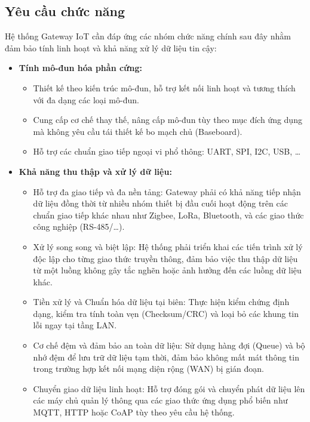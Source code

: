 \subsection{Yêu cầu chức năng}
    Hệ thống Gateway IoT cần đáp ứng các nhóm chức năng chính sau đây nhằm đảm bảo tính linh hoạt và khả năng xử lý dữ liệu tin cậy:

    \begin{itemize}
        \item \textbf{Tính mô-đun hóa phần cứng:}
        \begin{itemize}
            \item Thiết kế theo kiến trúc mô-đun, hỗ trợ kết nối linh hoạt và tương thích với đa dạng các loại mô-đun.
            \item Cung cấp cơ chế thay thế, nâng cấp mô-đun tùy theo mục đích ứng dụng mà không yêu cầu tái thiết kế bo mạch chủ (Baseboard).
            \item Hỗ trợ các chuẩn giao tiếp ngoại vi phổ thông: UART, SPI, I2C, USB, \dots
        \end{itemize}
        
        \item \textbf{Khả năng thu thập và xử lý dữ liệu:}
        \begin{itemize}
            \item Hỗ trợ đa giao tiếp và đa nền tảng: Gateway phải có khả năng tiếp nhận dữ liệu đồng thời từ nhiều nhóm thiết bị đầu cuối hoạt động trên các chuẩn giao tiếp khác nhau như Zigbee, LoRa, Bluetooth, và các giao thức công nghiệp (RS-485/\ldots).
            \item Xử lý song song và biệt lập: Hệ thống phải triển khai các tiến trình xử lý độc lập cho từng giao thức truyền thông, đảm bảo việc thu thập dữ liệu từ một luồng không gây tắc nghẽn hoặc ảnh hưởng đến các luồng dữ liệu khác.
            \item Tiền xử lý và Chuẩn hóa dữ liệu tại biên: Thực hiện kiểm chứng định dạng, kiểm tra tính toàn vẹn (Checksum/CRC) và loại bỏ các khung tin lỗi ngay tại tầng LAN.
            \item Cơ chế đệm và đảm bảo an toàn dữ liệu: Sử dụng hàng đợi (Queue) và bộ nhớ đệm để lưu trữ dữ liệu tạm thời, đảm bảo không mất mát thông tin trong trường hợp kết nối mạng diện rộng (WAN) bị gián đoạn.
            \item Chuyển giao dữ liệu linh hoạt: Hỗ trợ đóng gói và chuyển phát dữ liệu lên các máy chủ quản lý thông qua các giao thức ứng dụng phổ biến như MQTT, HTTP hoặc CoAP tùy theo yêu cầu hệ thống.
        \end{itemize}
        

\end{itemize}
